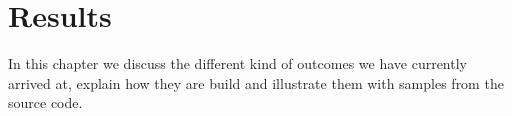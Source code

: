 \chapter{Results}
\label{chp:results}

In this chapter we discuss the different kind of outcomes we have currently arrived at, explain how they are build and illustrate them with samples from the source code.



